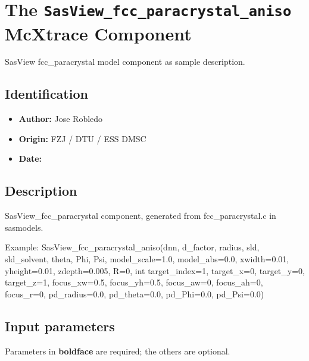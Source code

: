 \section{The \texttt{SasView\_fcc\_paracrystal\_aniso} McXtrace Component}
SasView fcc\_paracrystal model component as sample description.

\subsection*{Identification}
\begin{itemize}
  \item \textbf{Author:} Jose Robledo
  \item \textbf{Origin:} FZJ / DTU / ESS DMSC
  \item \textbf{Date:} 
\end{itemize}

\subsection*{Description}
SasView\_fcc\_paracrystal component, generated from fcc\_paracrystal.c in sasmodels.

Example: SasView\_fcc\_paracrystal\_aniso(dnn, d\_factor, radius, sld, sld\_solvent, theta, Phi, Psi, model\_scale=1.0, model\_abs=0.0, xwidth=0.01, yheight=0.01, zdepth=0.005, R=0, int target\_index=1, target\_x=0, target\_y=0, target\_z=1, focus\_xw=0.5, focus\_yh=0.5, focus\_aw=0, focus\_ah=0, focus\_r=0, pd\_radius=0.0, pd\_theta=0.0, pd\_Phi=0.0, pd\_Psi=0.0)

\subsection*{Input parameters}
Parameters in \textbf{boldface} are required; the others are optional.

